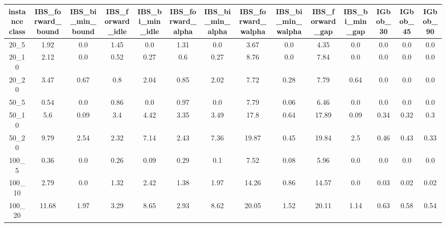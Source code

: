 \begin{tabular}{c|ccccccccccccc}
instance class & IBS\_forward\_bound & IBS\_bi\_min\_bound & IBS\_forward\_idle & IBS\_bi\_min\_idle & IBS\_forward\_alpha & IBS\_bi\_min\_alpha & IBS\_forward\_walpha & IBS\_bi\_min\_walpha & IBS\_forward\_gap & IBS\_bi\_min\_gap & IGbob\_30 & IGbob\_45 & IGbob\_90 \\ 
\hline
20\_5        & 1.92         & 0.0          & 1.45         & 0.0          & 1.31         & 0.0          & 3.67         & 0.0          & 4.35         & 0.0          & 0.0          & 0.0          & 0.0          \\ 
20\_10       & 2.12         & 0.0          & 0.52         & 0.27         & 0.6          & 0.27         & 8.76         & 0.0          & 7.84         & 0.0          & 0.0          & 0.0          & 0.0          \\ 
20\_20       & 3.47         & 0.67         & 0.8          & 2.04         & 0.85         & 2.02         & 7.72         & 0.28         & 7.79         & 0.64         & 0.0          & 0.0          & 0.0          \\ 
50\_5        & 0.54         & 0.0          & 0.86         & 0.0          & 0.97         & 0.0          & 7.79         & 0.06         & 6.46         & 0.0          & 0.0          & 0.0          & 0.0          \\ 
50\_10       & 5.6          & 0.09         & 3.4          & 4.42         & 3.35         & 3.49         & 17.8         & 0.64         & 17.89        & 0.09         & 0.34         & 0.32         & 0.3          \\ 
50\_20       & 9.79         & 2.54         & 2.32         & 7.14         & 2.43         & 7.36         & 19.87        & 0.45         & 19.84        & 2.5          & 0.46         & 0.43         & 0.33         \\ 
100\_5       & 0.36         & 0.0          & 0.26         & 0.09         & 0.29         & 0.1          & 7.52         & 0.08         & 5.96         & 0.0          & 0.0          & 0.0          & 0.0          \\ 
100\_10      & 2.79         & 0.0          & 1.32         & 2.42         & 1.38         & 1.97         & 14.26        & 0.86         & 14.57        & 0.0          & 0.03         & 0.02         & 0.02         \\ 
100\_20      & 11.68        & 1.97         & 3.29         & 8.65         & 2.93         & 8.62         & 20.05        & 1.52         & 20.11        & 1.14         & 0.63         & 0.58         & 0.54         \\ 

\end{tabular}
